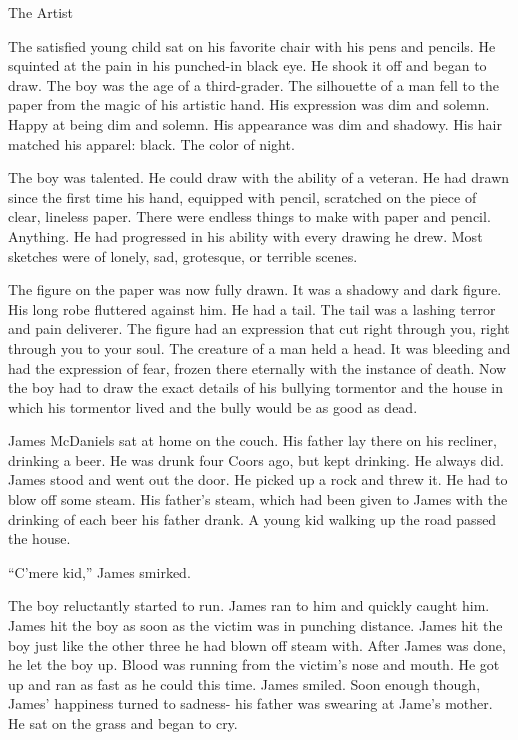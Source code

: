 The Artist


The satisfied young child sat on his favorite chair with his pens and
pencils. He squinted at the pain in his punched-in black eye. He shook
it off and began to draw. The boy was the age of a third-grader. The
silhouette of a man fell to the paper from the magic of his artistic
hand. His expression was dim and solemn. Happy at being dim and
solemn. His appearance was dim and shadowy. His hair matched his
apparel: black. The color of night.

The boy was talented. He could draw with the ability of a veteran. He
had drawn since the first time his hand, equipped with pencil, scratched
on the piece of clear, lineless paper. There were endless things to make
with paper and pencil. Anything. He had progressed in his ability with
every drawing he drew. Most sketches were of lonely, sad, grotesque, or
terrible scenes.

The figure on the paper was now fully drawn. It was a shadowy and dark
figure. His long robe fluttered against him. He had a tail. The tail was
a lashing terror and pain deliverer. The figure had an expression that
cut right through you, right through you to your soul. The creature of a
man held a head. It was bleeding and had the expression of fear, frozen
there eternally with the instance of death. Now the boy had to draw the
exact details of his bullying tormentor and the house in which his
tormentor lived and the bully would be as good as dead.

James McDaniels sat at home on the couch. His father lay there on his
recliner, drinking a beer. He was drunk four Coors ago, but kept
drinking. He always did. James stood and went out the door. He picked up
a rock and threw it. He had to blow off some steam. His father's steam,
which had been given to James with the drinking of each beer his father
drank. A young kid walking up the road passed the house.

``C'mere kid,'' James smirked.

The boy reluctantly started to run. James ran to him and quickly caught
him. James hit the boy as soon as the victim was in punching
distance. James hit the boy just like the other three he had blown off
steam with. After James was done, he let the boy up. Blood was running
from the victim's nose and mouth. He got up and ran as fast as he could
this time. James smiled. Soon enough though, James' happiness turned to
sadness- his father was swearing at Jame's mother. He sat on the grass
and began to cry.

